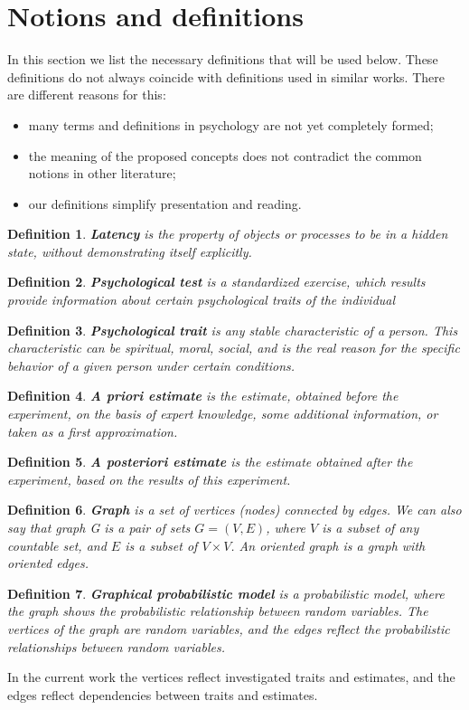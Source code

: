 \documentclass[12pt]{article}
\newtheorem{definition}{Definition}[section]
\begin{document}
\section{Notions and definitions}
\label{sec:defi}
In this section we list the necessary definitions that will be used below. These definitions do not always coincide with definitions used in similar works. There are different reasons for this:
\begin{itemize} 
\item many terms and definitions in psychology are not yet completely formed;
\item the meaning of the proposed concepts does not contradict the common notions in other literature;
\item our definitions simplify presentation and reading.
\end{itemize} 
%
\begin{definition}
\textbf{Latency} is the property of objects or processes to be in a hidden state, without demonstrating itself explicitly.
 \label{definition1}
\end{definition}
%
\begin{definition}
\textbf{Psychological test} is a standardized exercise, which results provide information about certain psychological traits of the individual
 \label{definition2}
\end{definition}
%
\begin{definition}
\textbf{Psychological trait} is any stable characteristic of a person. This characteristic can be spiritual, moral, social, and is the real reason for the specific behavior of a given person under certain conditions.
 \label{definition3}
\end{definition}
%
\begin{definition}
\textbf{A priori estimate} is the estimate, obtained before the experiment, on the basis of expert knowledge, some additional information, or taken as a first approximation.
 \label{definition4}
\end{definition}
%
\begin{definition}
\textbf{A posteriori estimate} is the estimate obtained after the experiment, based on the results of this experiment.
 \label{definition5}
\end{definition}
%
\begin{definition}
\textbf{Graph} is a set of vertices (nodes) connected by edges. We can also say that graph G is a pair of sets $G = (V,E)$, where $V$ is a subset of any countable set, and $E$ is a subset of $V \times V$. An oriented graph is a graph with oriented edges.
 \label{definition6}
\end{definition}
%
\begin{definition}
\textbf{Graphical probabilistic model} is a probabilistic model, where the graph shows the probabilistic relationship between random variables. The vertices of the graph are random variables, and the edges reflect the probabilistic relationships between random variables.
 \label{definition7}
\end{definition}
In the current work the vertices reflect investigated traits and estimates, and the edges reflect dependencies between traits and estimates.
\end{document}
